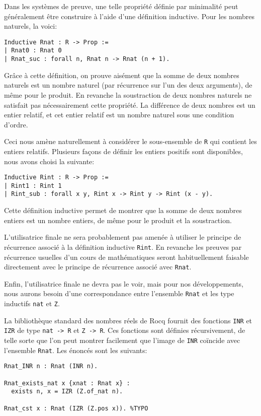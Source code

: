 \documentclass{jflart}
\begin{document}
Dans les systèmes de preuve, une telle propriété définie par minimalité
peut généralement être construire à l'aide d'une définition inductive.
Pour les nombres naturels, la voici:
\begin{verbatim}
Inductive Rnat : R -> Prop :=
| Rnat0 : Rnat 0
| Rnat_suc : forall n, Rnat n -> Rnat (n + 1).
\end{verbatim}

Grâce à cette définition, on prouve aisément que la somme de deux
nombres naturels est un nombre naturel (par récurrence sur l'un des
deux arguments), de même pour le produit.  En revanche la soustraction
de deux nombres naturels ne satisfait pas nécessairement cette
propriété.  La différence de deux nombres est un entier relatif, et
cet entier relatif est un nombre naturel sous une condition d'ordre.

Ceci nous amène naturellement à considérer le sous-ensemble de \texttt{R}
qui contient les entiers relatifs.  Plusieurs façons de définir les
entiers positifs sont disponibles, nous avons choisi la suivante:
\begin{verbatim}
Inductive Rint : R -> Prop :=
| Rint1 : Rint 1
| Rint_sub : forall x y, Rint x -> Rint y -> Rint (x - y).
\end{verbatim}
Cette définition inductive permet de montrer que la somme de deux
nombres entiers est un nombre entiers, de même pour le produit et
la soustraction.

L'utilisatrice finale ne sera probablement pas amenée à utiliser le
principe de récurrence associé à la définition inductive \texttt{Rint}.
En revanche les preuves par récurrence usuelles d'un cours de
mathématiques seront habituellement faisable directement avec le
principe de récurrence associé avec \texttt{Rnat}.

Enfin, l'utilisatrice finale ne devra pas le voir,
mais pour nos développements, nous aurons besoin d'une
correspondance entre l'ensemble \texttt{Rnat} et les type inductifs
\texttt{nat} et \texttt{Z}.

La bibliothèque standard des nombres réels de Rocq fournit des fonctions
\texttt{INR} et \texttt{IZR} de type \texttt{nat -> R} et \texttt{Z -> R}.
Ces fonctions sont définies récursivement, de telle sorte que l'on peut
montrer facilement
que l'image de \texttt{INR} coïncide avec l'ensemble \texttt{Rnat}.  Les
énoncés sont les suivants:
\begin{verbatim}
Rnat_INR n : Rnat (INR n).

Rnat_exists_nat x {xnat : Rnat x} :
  exists n, x = IZR (Z.of_nat n).

Rnat_cst x : Rnat (IZR (Z.pos x)). %TYPO 
\end{verbatim}
\end{document}
